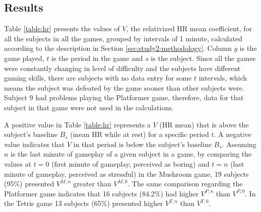\subsection{Results}

Table \ref{table:hr} presents the values of $V$, the relativized HR mean coefficient, for all the subjects in all the games, grouped by intervals of 1 minute, calculated according to the description in Section \ref{sec:study2-methodology}. Column $g$ is the game played, $t$ is the period in the game and $s$ is the subject. Since all the games were constantly changing in level of difficulty and the subjects have different gaming skills, there are subjects with no data entry for some $t$ intervals, which means the subject was defeated by the game sooner than other subjects were. Subject 9 had problems playing the Platformer game, therefore, data for that subject in that game were not used in the calculations.

A positive value in Table \ref{table:hr} represents a $V$ (HR mean) that is above the subject's baseline $B_s$ (mean HR while at rest) for a specific period $t$. A negative value indicates that $V$ in that period is below the subject's baseline $B_s$. Assuming $n$ is the last minute of gameplay of a given subject in a game, by comparing the values at $t=0$ (first minute of gameplay, perceived as boring) and $t=n$ (last minute of gameplay, perceived as stressful) in the Mushroom game, 19 subjects (95\%) presented $V^{M,n}$ greater than $V^{M,0}$. The same comparison regarding the Platformer game indicates that 16 subjects (84.2\%) had higher $V^{P,n}$ than $V^{P,0}$. In the Tetris game 13 subjects (65\%) presented higher $V^{T,n}$ than $V^{T,0}$.

